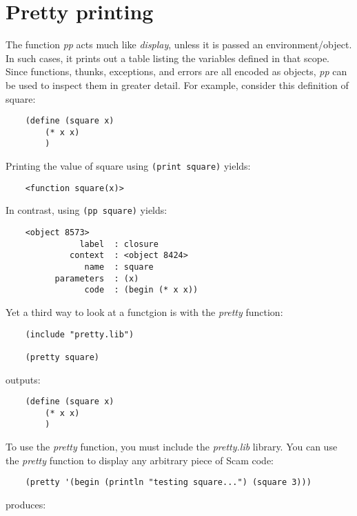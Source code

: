 \section{Pretty printing}

The function {\it pp} acts much like {\it display}, unless it is
passed an environment/object. In such cases, it prints out a table
listing the variables defined in that scope.
Since functions, thunks, exceptions, and errors are all encoded
as objects, {\it pp} can be used to inspect them in greater detail.
For example, consider this definition of square:

\begin{verbatim}
    (define (square x)
        (* x x)
        )
\end{verbatim}

Printing the value of square using \verb!(print square)! yields:

\begin{verbatim}
    <function square(x)>
\end{verbatim}

In contrast, using \verb!(pp square)! yields:

\begin{verbatim}
    <object 8573>
               label  : closure
             context  : <object 8424>
                name  : square
          parameters  : (x)
                code  : (begin (* x x))
\end{verbatim}

Yet a third way to look at a functgion is with the {\it pretty} function:

\begin{verbatim}
    (include "pretty.lib")

    (pretty square)
\end{verbatim}

outputs:

\begin{verbatim}
    (define (square x)
        (* x x)
        )
\end{verbatim}

To use the {\it pretty} function, you must include the {\it pretty.lib} library.
You can use the {\it pretty} function to display any arbitrary piece of 
Scam code:

\begin{verbatim}
    (pretty '(begin (println "testing square...") (square 3)))
\end{verbatim}

produces:

